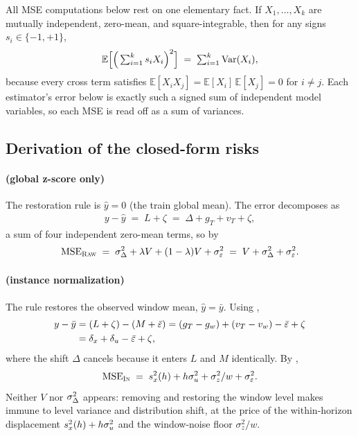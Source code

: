 All MSE computations below rest on one elementary fact. If $X_1,\dots,X_k$ are mutually independent, zero-mean, and square-integrable, then for any signs $s_i \in \{-1,+1\}$,
\begin{equation}\label{eq:app-orth}
  \mathbb{E}\Big[\Big(\textstyle\sum_{i=1}^{k} s_i X_i\Big)^{2}\Big]
  \;=\; \sum_{i=1}^{k} \mathrm{Var}(X_i),
\end{equation}
because every cross term satisfies $\mathbb{E}[X_i X_j] = \mathbb{E}[X_i]\,\mathbb{E}[X_j] = 0$ for $i \neq j$. Each estimator's error below is exactly such a signed sum of independent model variables, so each MSE is read off as a sum of variances.

\subsection{Derivation of the closed-form risks}\label{app:proofs:mse}

\paragraph{\rawm{} (global z-score only)}
The restoration rule is $\hat y = 0$ (the train global mean). The error decomposes as
\begin{align}
  y - \hat y \;=\; L + \zeta \;=\; \Delta + g_T + v_T + \zeta ,
\end{align}
a sum of four independent zero-mean terms, so by 
\begin{equation}\label{eq:app-mseraw}
  \mathrm{MSE}_{\textsc{Raw}} \;=\; \sigma_\Delta^2 + \lambda V + (1-\lambda)V + \sigma_\varepsilon^2
  \;=\; V + \sigma_\Delta^2 + \sigma_\varepsilon^2 .
\end{equation}

\paragraph{\inm{} (instance normalization)}
The rule restores the observed window mean, $\hat y = \bar y$. Using ,
\begin{align}
  y - \bar y
  &= (L + \zeta) - (M + \bar\varepsilon)
   = (g_T - g_w) + (v_T - v_w) - \bar\varepsilon + \zeta \notag\\
  &= \delta_x + \delta_u - \bar\varepsilon + \zeta ,
\end{align}
where the shift $\Delta$ cancels because it enters $L$ and $M$ identically. By ,
\begin{equation}\label{eq:app-msein}
  \mathrm{MSE}_{\textsc{In}} \;=\; s_x^2(h) + h\sigma_u^2 + \sigma_z^2/w + \sigma_\varepsilon^2 .
\end{equation}
Neither $V$ nor $\sigma_\Delta^2$ appears: removing and restoring the window level makes \inm{} immune to level variance and distribution shift, at the price of the within-horizon displacement $s_x^2(h) + h\sigma_u^2$ and the window-noise floor $\sigma_z^2/w$.

